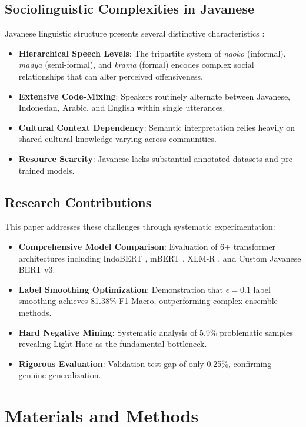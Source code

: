 \documentclass[conference]{IEEEtran}
\begin{document}
\subsection{Sociolinguistic Complexities in Javanese}
Javanese linguistic structure presents several distinctive characteristics \cite{poedjosoedarmo1968javanese}:
\begin{itemize}
    \item \textbf{Hierarchical Speech Levels}: The tripartite system of \textit{ngoko} (informal), \textit{madya} (semi-formal), and \textit{krama} (formal) encodes complex social relationships that can alter perceived offensiveness.
    \item \textbf{Extensive Code-Mixing}: Speakers routinely alternate between Javanese, Indonesian, Arabic, and English within single utterances.
    \item \textbf{Cultural Context Dependency}: Semantic interpretation relies heavily on shared cultural knowledge varying across communities.
    \item \textbf{Resource Scarcity}: Javanese lacks substantial annotated datasets and pre-trained models.
\end{itemize}

\subsection{Research Contributions}
This paper addresses these challenges through systematic experimentation:
\begin{itemize}
    \item \textbf{Comprehensive Model Comparison}: Evaluation of 6+ transformer architectures including IndoBERT \cite{wilie-etal-2020-indonlu}, mBERT \cite{devlin-etal-2019-bert}, XLM-R \cite{conneau2019unsupervised}, and Custom Javanese BERT v3.
    \item \textbf{Label Smoothing Optimization}: Demonstration that $\epsilon=0.1$ label smoothing achieves 81.38\% F1-Macro, outperforming complex ensemble methods.
    \item \textbf{Hard Negative Mining}: Systematic analysis of 5.9\% problematic samples revealing Light Hate as the fundamental bottleneck.
    \item \textbf{Rigorous Evaluation}: Validation-test gap of only 0.25\%, confirming genuine generalization.
\end{itemize}

\section{Materials and Methods}
\end{document}
